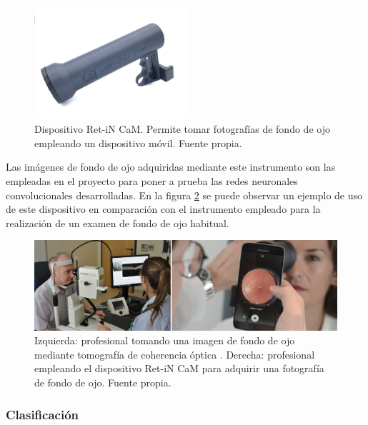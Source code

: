 \begin{figure}[h]
    \centering
    \includegraphics[width=0.5\textwidth]{img/retincam dispositivo.jpg}
    \caption{Dispositivo Ret-iN CaM. Permite tomar fotografías de fondo de ojo empleando un dispositivo móvil. Fuente propia.}
    \label{fig:retincam_dispositivo}
\end{figure}

Las imágenes de fondo de ojo adquiridas mediante este instrumento son las empleadas en el proyecto para poner a prueba las redes neuronales convolucionales desarrolladas. En la figura \ref{fig:retincam_oct} se puede observar un ejemplo de uso de este dispositivo en comparación con el instrumento empleado para la realización de un examen de fondo de ojo habitual.

\begin{figure}[h]
    \centering
    \includegraphics[width=1\textwidth]{img/retincam_oct.png}
    \caption{Izquierda: profesional tomando una imagen de fondo de ojo mediante tomografía de coherencia óptica \cite{retino:OMS}. Derecha: profesional empleando el dispositivo Ret-iN CaM para adquirir una fotografía de fondo de ojo. Fuente propia.}
    \label{fig:retincam_oct}
\end{figure}

\titlespacing{\subsubsection}{0pt}{0.25cm}{0.1cm}
\subsubsection{Clasificación}

